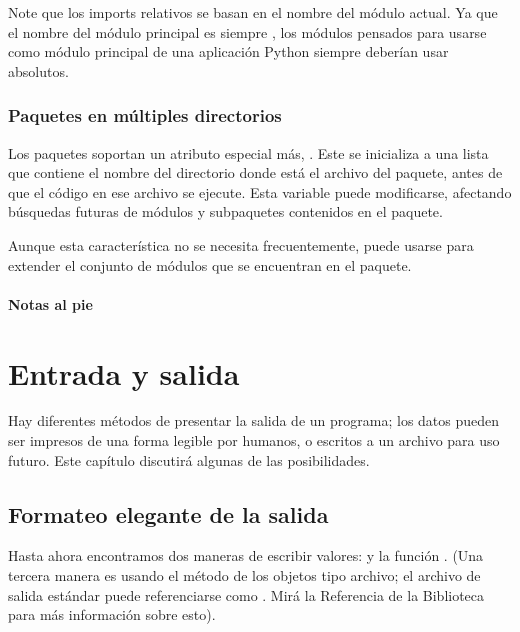 \documentclass[a4,10pt,spanish]{sphinxmanual}
\begin{document}
\sphinxAtStartPar
Note que los imports relativos se basan en el nombre del módulo actual.  Ya que el nombre del módulo principal es siempre , los módulos pensados para usarse como módulo principal de una aplicación Python siempre deberían usar  absolutos.


\subsection{Paquetes en múltiples directorios}
\label{\detokenize{tutorial/modules:packages-in-multiple-directories}}
\sphinxAtStartPar
Los paquetes soportan un atributo especial más, .  Este se inicializa a una lista que contiene el nombre del directorio donde está el archivo  del paquete, antes de que el código en ese archivo se ejecute.  Esta variable puede modificarse, afectando búsquedas futuras de módulos y subpaquetes contenidos en el paquete.

\sphinxAtStartPar
Aunque esta característica no se necesita frecuentemente, puede usarse para extender el conjunto de módulos que se encuentran en el paquete.
\subsubsection*{Notas al pie}


\chapter{Entrada y salida}
\label{\detokenize{tutorial/inputoutput:input-and-output}}\label{\detokenize{tutorial/inputoutput:tut-io}}\label{\detokenize{tutorial/inputoutput::doc}}
\sphinxAtStartPar
Hay diferentes métodos de presentar la salida de un programa; los datos pueden ser impresos de una forma legible por humanos, o escritos a un archivo para uso futuro. Este capítulo discutirá algunas de las posibilidades.


\section{Formateo elegante de la salida}
\label{\detokenize{tutorial/inputoutput:fancier-output-formatting}}\label{\detokenize{tutorial/inputoutput:tut-formatting}}
\sphinxAtStartPar
Hasta ahora encontramos dos maneras de escribir valores:  y la función .  (Una tercera manera es usando el método  de los objetos tipo archivo; el archivo de salida estándar puede referenciarse como .  Mirá la Referencia de la Biblioteca para más información sobre esto).
\end{document}
